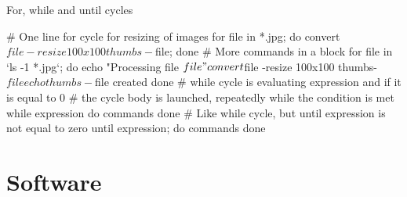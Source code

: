 \documentclass[compress, ucs, xelatex, 11pt, xcolor=svgnames,
  hyperref={
    bookmarks=true,
    unicode=true,
    colorlinks=true,
    pdftitle={Linux, command line and MetaCentrum},
    plainpages=false,
    pdfauthor={Vojtech Zeisek},
    pdfsubject={Course about use of Linux command line, writing shell scripts and using MetaCentrum of CESNET},
    pdfcreator={XeLaTeX},
    pdfkeywords={Linux, GNU, BASH, shell, command line, MetaCentrum},
    linkcolor=Red,
    anchorcolor=Blue,
    citecolor=Purple,
    filecolor=DodgerBlue,
    menucolor=DarkOrchid,
    urlcolor=DeepSkyBlue,
    pdftex},
  url={hyphens, lowtilde} %
  ]{beamer}
\begin{document}
\begin{frame}[fragile]{For, while and until cycles}
  \begin{bashcode}
    # One line for cycle for resizing of images
    for file in *.jpg; do convert $file -resize 100x100 thumbs-$file; done
    # More commands in a block
    for file in `ls -1 *.jpg`; do
      echo "Processing file $file"
      convert $file -resize 100x100 thumbs-$file
      echo thumbs-$file created
      done
    # while cycle is evaluating expression and if it is equal to 0
    # the cycle body is launched, repeatedly while the condition is met
    while expression
      do
        commands
      done
    # Like while cycle, but until expression is not equal to zero
    until expression; do
      commands
      done
  \end{bashcode}
\end{frame}

\section{Software}
\end{document}
